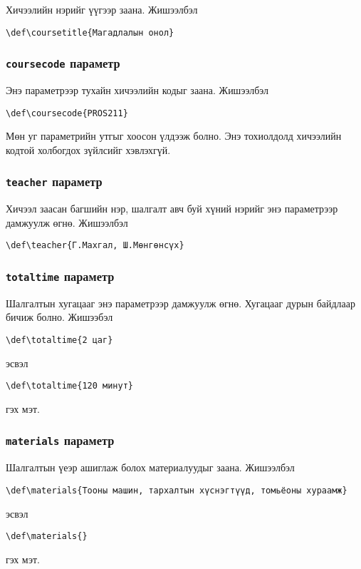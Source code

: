 \documentclass[10pt]{article}
\theoremstyle{definition}
\begin{document}
Хичээлийн нэрийг үүгээр заана. Жишээлбэл 
\begin{verbatim}
\def\coursetitle{Магадлалын онол}
\end{verbatim}

\subsubsection{\texttt{coursecode} параметр}

Энэ параметрээр тухайн хичээлийн кодыг заана. Жишээлбэл
\begin{verbatim}
\def\coursecode{PROS211}
\end{verbatim}
Мөн уг параметрийн утгыг хоосон үлдээж болно. Энэ тохиолдолд хичээлийн кодтой холбогдох зүйлсийг хэвлэхгүй.

\subsubsection{\texttt{teacher} параметр}

Хичээл заасан багшийн нэр, шалгалт авч буй хүний нэрийг энэ параметрээр дамжуулж өгнө. Жишээлбэл
\begin{verbatim}
\def\teacher{Г.Махгал, Ш.Мөнгөнсүх}
\end{verbatim}

\subsubsection{\texttt{totaltime} параметр}

Шалгалтын хугацааг энэ параметрээр дамжуулж өгнө. Хугацааг дурын байдлаар бичиж болно. Жишээбэл
\begin{verbatim}
\def\totaltime{2 цаг}
\end{verbatim}
эсвэл
\begin{verbatim}
\def\totaltime{120 минут}
\end{verbatim}
гэх мэт.

\subsubsection{\texttt{materials} параметр}

Шалгалтын үеэр ашиглаж болох материалуудыг заана. Жишээлбэл
\begin{verbatim}
\def\materials{Тооны машин, тархалтын хүснэгтүүд, томьёоны хураамж}
\end{verbatim}
эсвэл
\begin{verbatim}
\def\materials{}
\end{verbatim}
гэх мэт.
\end{document}

